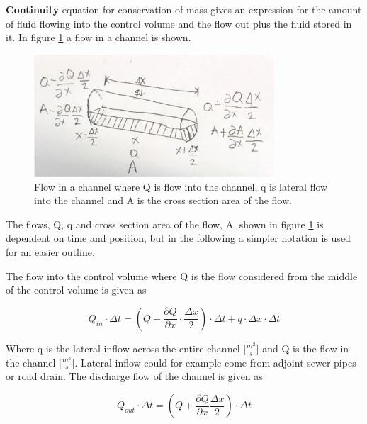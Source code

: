 \textbf{Continuity} equation for conservation of mass gives an expression for the amount of fluid flowing into the control volume and the flow out plus the fluid stored in it.
In figure \ref{fig:firkant_kloak} a flow in a channel is shown.

\begin{figure}[H]
\centering
\includegraphics[width=0.8\textwidth]{report/modeling/pictures/continuity_open_channel.jpg}
\caption{Flow in a channel where Q is flow into the channel, q is lateral flow into the channel and A is the cross section area of the flow.}
\label{fig:firkant_kloak}
\end{figure}

The flows, Q, q and cross section area of the flow, A, shown in figure \ref{fig:firkant_kloak} is dependent on time and position, but in the following a simpler notation is used for an easier outline. 

The flow into the control volume where Q is the flow considered from the middle of the control volume is given as

\begin{equation}
Q_{in} \cdot \Delta t =	\left(Q - \frac{\partial Q}{\partial x}\cdot \frac{\Delta x}{2}\right) \cdot \Delta t + q \cdot \Delta x \cdot \Delta t
\label{flowin_saintbernard}
\end{equation}

Where q is the lateral inflow across the entire channel [$\frac{m^2}{s}$] and Q is the flow in the channel [$\frac{m^3}{s}$]. Lateral inflow could for example come from adjoint sewer pipes or road drain.
The discharge flow of the channel is given as

\begin{equation}
Q_{out} \cdot \Delta t =\left(Q + \frac{\partial Q}{ \partial x} \frac{\Delta x}{2} \right) \cdot \Delta t 
\label{flowout_saintbernard}
\end{equation}

